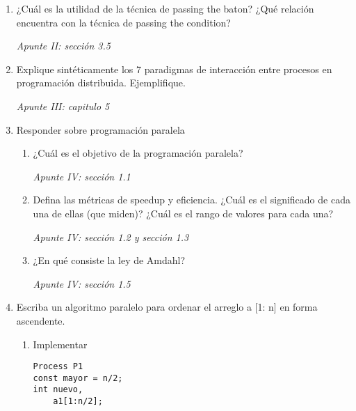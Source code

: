 \documentclass[a4paper, 10pt]{article}
\newenvironment{QandA}{
    \begin{enumerate}\bfseries}
    {\end{enumerate}
}
\newenvironment{answered}{\par\normalfont}{}
\begin{document}
\begin{QandA}

\item ¿Cuál es la utilidad de la técnica de passing the baton? ¿Qué relación encuentra con la técnica de passing the condition?
\begin{answered}
    \emph{Apunte II: sección 3.5}
\end{answered}


\item Explique sintéticamente los 7 paradigmas de interacción entre procesos en programación distribuida. Ejemplifique.
\begin{answered}
    \emph{Apunte III: capitulo 5}
\end{answered}


\item Responder sobre programación paralela
\begin{enumerate}
    \item ¿Cuál es el objetivo de la programación paralela?
    \begin{answered}
        \emph{Apunte IV: sección 1.1}
    \end{answered}
    \item Defina las métricas de speedup y eficiencia. ¿Cuál es el significado de cada una de ellas (que miden)? ¿Cuál es el rango de valores para cada una?
    \begin{answered}
        \emph{Apunte IV: sección 1.2 y sección 1.3}
    \end{answered}
    \item ¿En qué consiste la ley de Amdahl?
    \begin{answered}
        \emph{Apunte IV: sección 1.5}
    \end{answered}
\end{enumerate}


\item Escriba un algoritmo paralelo para ordenar el arreglo a [1: n] en forma ascendente.
\begin{enumerate}
\item Implementar
\begin{answered}
\begin{minipage}[t]{.5\linewidth}
\begin{lstlisting}
Process P1
const mayor = n/2;
int nuevo,
    a1[1:n/2];


\end{lstlisting}
\end{minipage}
\end{answered}
\end{enumerate}
\end{QandA}
\end{document}
